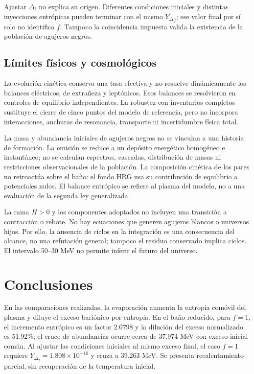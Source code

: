\documentclass[10pt,twocolumn,a4paper]{article}
\newcommand{\Y}{{Y_\Delta}}
\begin{document}
Ajustar $\Delta_i$ no explica su origen. Diferentes condiciones iniciales y distintas inyecciones entrópicas pueden terminar con el mismo $\Y_f$; ese valor final por sí solo no identifica $f$. Tampoco la coincidencia impuesta valida la existencia de la población de agujeros negros.

\subsection{Límites físicos y cosmológicos}
La evolución cinética conserva una tasa efectiva y no resuelve dinámicamente los balances eléctricos, de extrañeza y leptónicos. Esos balances se resolvieron en controles de equilibrio independientes. La robustez con inventarios completos sustituye el cierre de cinco puntos del modelo de referencia, pero no incorpora interacciones, anchuras de resonancia, transporte ni incertidumbre física total.

La masa y abundancia iniciales de agujeros negros no se vinculan a una historia de formación. La emisión se reduce a un depósito energético homogéneo e instantáneo; no se calculan espectros, cascadas, distribución de masas ni restricciones observacionales de la población. La composición cinética de los pares no retroactúa sobre el baño: el fondo HRG usa su contribución de equilibrio a potenciales nulos. El balance entrópico se refiere al plasma del modelo, no a una evaluación de la segunda ley generalizada.

La rama $H>0$ y los componentes adoptados no incluyen una transición a contracción o rebote. No hay ecuaciones que generen agujeros blancos o universos hijos. Por ello, la ausencia de ciclos en la integración es una consecuencia del alcance, no una refutación general; tampoco el residuo conservado implica ciclos. El intervalo 50--30 MeV no permite inferir el futuro del universo.

\section{Conclusiones}
En las comparaciones realizadas, la evaporación aumenta la entropía comóvil del plasma y diluye el exceso bariónico por entropía. En el baño reducido, para $f=1$, el incremento entrópico es un factor 2.0798 y la dilución del exceso normalizado es 51.92\%; el cruce de abundancias ocurre cerca de 37.974 MeV con exceso inicial común. Al ajustar las condiciones iniciales al mismo exceso final, el caso $f=1$ requiere $\Y_i=1.808\times10^{-10}$ y cruza a 39.263 MeV. Se presenta recalentamiento parcial, sin recuperación de la temperatura inicial.
\end{document}

